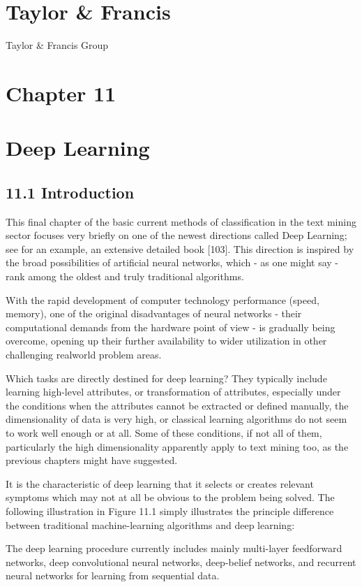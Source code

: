 \documentclass[10pt]{book}
\begin{document}
\section*{Taylor \& Francis }
Taylor \& Francis Group



\section*{Chapter 11}
\section*{Deep Learning}
\subsection*{11.1 Introduction}
This final chapter of the basic current methods of classification in the text mining sector focuses very briefly on one of the newest directions called Deep Learning; see for an example, an extensive detailed book [103]. This direction is inspired by the broad possibilities of artificial neural networks, which - as one might say - rank among the oldest and truly traditional algorithms.

With the rapid development of computer technology performance (speed, memory), one of the original disadvantages of neural networks - their computational demands from the hardware point of view - is gradually being overcome, opening up their further availability to wider utilization in other challenging realworld problem areas.

Which tasks are directly destined for deep learning? They typically include learning high-level attributes, or transformation of attributes, especially under the conditions when the attributes cannot be extracted or defined manually, the dimensionality of data is very high, or classical learning algorithms do not seem to work well enough or at all. Some of these conditions, if not all of them, particularly the high dimensionality apparently apply to text mining too, as the previous chapters might have suggested.

It is the characteristic of deep learning that it selects or creates relevant symptoms which may not at all be obvious to the problem being solved. The following illustration in Figure 11.1 simply illustrates the principle difference between traditional machine-learning algorithms and deep learning:

The deep learning procedure currently includes mainly multi-layer feedforward networks, deep convolutional neural networks, deep-belief networks, and recurrent neural networks for learning from sequential data.
\end{document}
